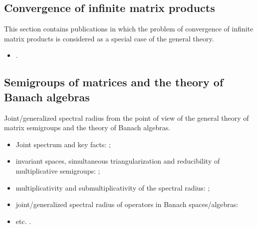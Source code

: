 \documentclass[a4paper,fleqn]{article}
\let\cite=\citep
\begin{document}
\subsection*{Convergence of infinite matrix products}
This section contains publications in which the problem of convergence of infinite matrix products is considered as a special case of the general theory.

\begin{itemize}

\item \cite{Ahmadi08, AhmPar:CDC05, AndoShih:SIAM:98, AKKK:92:e, BerWang:LAA92, BE:EJLA97, BeynEls96, BrayTong:TCS79, BrayTong:TCS80, BEN:ETNA94, BTV:MTNS02, BZ:AMPA18, ChM:LAA69, CiconePhD11, Cohen:MPCPS79, DaubLag:LAA92, DaubLag:LAA01, EF:LAA97, FLS:ETDS19, GugZen:LAA01, GurRod:SIAMJMAA97, GugZen:LAA03, Hajnal:MPCPS76, Hartfiel02, Holtz:EJLA00, HR:APM12, JGC:SIAMJMAA14, KasBh:2000, Koz:AiT90:10:e, Koz:DDNS18, Koz:ArXiv20, Mate:PAMS98, Mate:FM99, Mojskerc:LAA14, MorVar:DS23, NeuSch:ArXiv98, NSch:LAA99, PJ:LAA13, Shen:LAA00, Shih:LAA99, ShihPang:AJIFAC08, ShihWP:LAA97, SBKK:CDC97, SBKK:LAA98, SU:SIAMJMAA94, Szyld:TU98, Thomas:Arxiv18, Thomas:ArXiv22, Vlad:ArXiv16, WangCheng:LMA16}.
\end{itemize}

\subsection*{Semigroups of matrices and the theory of Banach algebras}
Joint/generalized spectral radius from the point of view of the general theory of matrix semigroups and the theory of Banach algebras.

\begin{itemize}

\item Joint spectrum and key facts: \cite{Bell:LAA05, BerWang:LAA92,
BreSert:LMS21, EE:PAMS04, GurRod:SIAMJMAA97, Lur:LAA06-2, RS:PAMS95,
Sert:Thesis16, Sert:CRMASP17};
\item invariant spaces, simultaneous triangularization and reducibility of multiplicative semigroups: \cite{Drnov:97, Drnovsek:SM97, Drn:IEOT01, GPRSTT:P10, Guinand:PAMS82, HNRRR:HJM91, LMMR:JOT98, OmRadj:LAA97, Prot:FPM96:e, Radj:IUMJ90, RRS:PAMS00, Szep:AMH86};
\item multiplicativity and submultiplicativity of the spectral radius: \cite{LR:CJM95, OmRadj:LAA97, ProtVoy:LAA17};
\item joint/generalized spectral radius of operators in Banach spaces/algebras: \cite{BD:StochDyn21, BF:AIF21, Bogdanovic:ArXiv23, BP:LMA22, EE:PAMS04, LS:LAA02, KisShulTur:20, Morris:JFA12, Muller:APM97, Pep:LMA11, Peperko:LAA12, RS:PAMS95, ShulTur:ArXiv12, ShulTur:JFA00, ShulTur:SM02, Turovskii:JFA99, TurShul:FAP00, TurShul:FAP12}
\item etc. \cite{Javaheri:JMAA13, ManSim:TCS78}.
\end{itemize}
\end{document}
